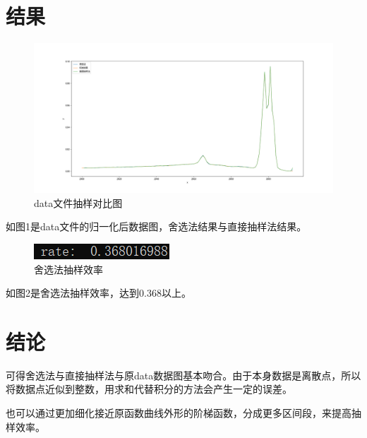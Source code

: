\documentclass{article}
\begin{document}
	\section{结果}
\begin{figure}[!h]
	
	\centering
	\includegraphics[scale=0.39]{data}
	\caption{\heiti{}data文件抽样对比图}
	
\end{figure}
	如图1是data文件的归一化后数据图，舍选法结果与直接抽样法结果。
	
	\begin{figure}[!h]
		
		\centering
		\includegraphics[scale=1]{result_3_7}
		\caption{\heiti{}舍选法抽样效率}
		
	\end{figure}
如图2是舍选法抽样效率，达到0.368以上。
	\section{结论}
	可得舍选法与直接抽样法与原data数据图基本吻合。由于本身数据是离散点，所以将数据点近似到整数，用求和代替积分的方法会产生一定的误差。
	
	
	也可以通过更加细化接近原函数曲线外形的阶梯函数，分成更多区间段，来提高抽样效率。
\end{document}
